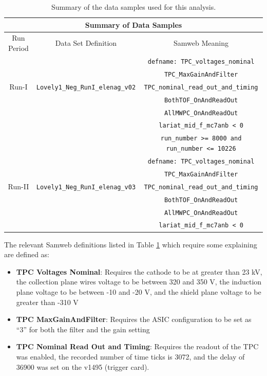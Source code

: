 \begin{center}
\begin{table}[htb]
	\begin{center}
	\begin{tabular}{|c|c|c|}
	\multicolumn{3}{c}{\textbf{Summary of Data Samples}} \\
	\hline \hline
	 Run Period & Data Set Definition & Samweb Meaning \\
	\hline
	 &  & \verb!defname: TPC_voltages_nominal! \\
	\hline
	 &  & \verb!TPC_MaxGainAndFilter! \\
	\hline
	Run-I & \verb!Lovely1_Neg_RunI_elenag_v02! & \verb!TPC_nominal_read_out_and_timing!  \\
	\hline
	 & & \verb!BothTOF_OnAndReadOut!  \\
	\hline
	 & & \verb!AllMWPC_OnAndReadOut!  \\
	 \hline
	 & & \verb!lariat_mid_f_mc7anb < 0! \\
	\hline
	\hline
	 & & \verb!run_number >= 8000 and run_number <= 10226! \\
    \hline	
	&  & \verb!defname: TPC_voltages_nominal! \\
	\hline
	 &  & \verb!TPC_MaxGainAndFilter! \\
	\hline
	Run-II & \verb!Lovely1_Neg_RunI_elenag_v03! & \verb!TPC_nominal_read_out_and_timing!  \\
	\hline
	 & & \verb!BothTOF_OnAndReadOut!  \\
	\hline
	 & & \verb!AllMWPC_OnAndReadOut!  \\
	 \hline
	 & & \verb!lariat_mid_f_mc7anb < 0! \\
	 \hline
	\end{tabular}%
	\caption{Summary of the data samples used for this analysis. }
	\label{tab:datasamples}
	\end{center}
\end{table}
\end{center}

The relevant Samweb definitions listed in Table \ref{tab:datasamples} which require some explaining are defined as:

\begin{itemize}
\item \textbf{TPC Voltages Nominal}: Requires the cathode to be at greater than 23 kV, the collection plane wires voltage to be between 320 and 350 V, the induction plane voltage to be between -10 and -20 V, and the shield plane voltage to be greater than -310 V

\item \textbf{TPC MaxGainAndFilter}: Requires the ASIC configuration to be set as ``3'' for both the filter and the gain setting

\item \textbf{TPC Nominal Read Out and Timing}: Requires the readout of the TPC was enabled, the recorded number of time ticks is 3072, and the delay of 36900 was set on the v1495 (trigger card).


\end{itemize} 



